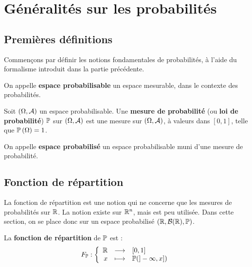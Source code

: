 \documentclass[../integ-proba.tex]{subfiles}
\begin{document}
    \chapter{Généralités sur les probabilités}

    \section{Premières définitions}

    Commençons par définir les notions fondamentales de probabilités, à l'aide du formalisme introduit dans la partie précédente.

    \begin{defi}
        On appelle \textbf{espace probabilisable} un espace mesurable, dans le contexte des probabilités.
    \end{defi}

    \begin{defi}
        Soit $\left(\Omega, \mathcal{A}\right)$ un espace probabilisable.
        Une \textbf{mesure de probabilité} (ou \textbf{loi de probabilité}) $\mathbb{P}$ sur $\left(\Omega, \mathcal{A}\right)$ est une mesure sur $\left(\Omega, \mathcal{A}\right)$, à valeurs dans $\left[0,1\right]$, telle que $\mathbb{P}\left(\Omega\right)=1$.
    \end{defi}

    \begin{defi}
        On appelle \textbf{espace probabilisé} un espace probabilisable muni d'une mesure de probabilité.
    \end{defi}

    \section{Fonction de répartition}

    La fonction de répartition est une notion qui ne concerne que les mesures de probabilités sur $\mathbb{R}$.
    La notion existe sur $\mathbb{R}^n$, mais est peu utilisée.
    Dans cette section, on se place donc sur un espace probabilisé $\left( \mathbb{R}, \mathcal{B}(\mathbb{R}), \mathbb{P} \right)$.

    \begin{defi}
        La \textbf{fonction de répartition} de $\mathbb{P}$ est :
        \begin{displaymath}
            F_{\mathbb{P}}:
            \left\{
            \begin{array}{rcl}
                \mathbb{R} & \longrightarrow & [0,1] \\
                x          & \longmapsto     & \mathbb{P}(]- \infty, x])
            \end{array}
            \right.
        \end{displaymath}
    \end{defi}
\end{document}
